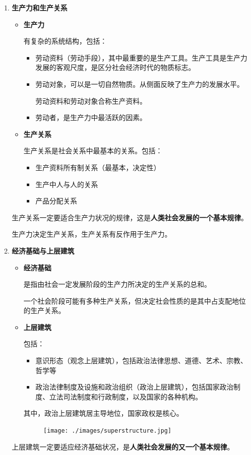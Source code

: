 \documentclass[12pt, a4paper, oneside]{ctexart}
\begin{document}
\begin{enumerate}
  \item {\bf 生产力和生产关系}
  
  \begin{itemize}
    \item {\bf 生产力}
    
    有复杂的系统结构，包括：
    \begin{itemize}
      \item 劳动资料（劳动手段），其中最重要的是生产工具。生产工具是生产力发展的客观尺度，是区分社会经济时代的物质标志。
      \item 劳动对象，可以是一切自然物质。从侧面反映了生产力的发展水平。
      
      劳动资料和劳动对象合称生产资料。

      \item 劳动者，是生产力中最活跃的因素。
    \end{itemize}
    \item {\bf 生产关系}
    
    生产关系是社会关系中最基本的关系。包括：
    \begin{itemize}
      \item 生产资料所有制关系（最基本，决定性）
      \item 生产中人与人的关系
      \item 产品分配关系
    \end{itemize}
  \end{itemize}

  生产关系一定要适合生产力状况的规律，这是\textbf{人类社会发展的一个基本规律}。

  生产力决定生产关系，生产关系有反作用于生产力。

  \item {\bf 经济基础与上层建筑}

  \begin{itemize}
    \item {\bf 经济基础}
    
    是指由社会一定发展阶段的生产力所决定的生产关系的总和。

    一个社会阶段可能有多种生产关系，但决定社会性质的是其中占支配地位的生产关系。

    \item {\bf 上层建筑}
    
    包括：
    \begin{itemize}
      \item 意识形态（观念上层建筑），包括政治法律思想、道德、艺术、宗教、哲学等
      \item 政治法律制度及设施和政治组织（政治上层建筑），包括国家政治制度、立法司法制度和行政制度，以及国家的各种机构。
    \end{itemize}

    其中，政治上层建筑居主导地位，国家政权是核心。

    \begin{figure}[h]
      \centering
      \texttt{[image: ./images/superstructure.jpg]}
    \end{figure}
  \end{itemize}

  上层建筑一定要适应经济基础状况，是\textbf{人类社会发展的又一个基本规律}。
\end{enumerate}
\end{document}
